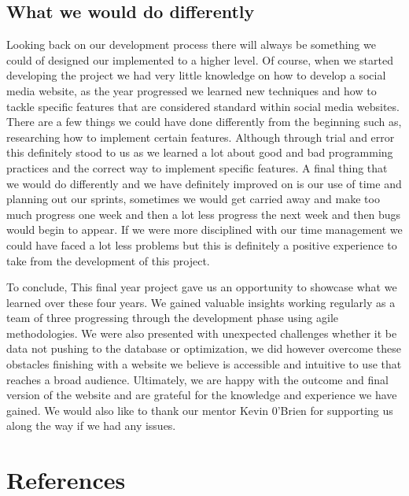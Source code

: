\section{What we would do differently}
\newline
Looking back on our development process there will always be something we could of designed our implemented to a higher level. Of course, when we started developing the project we had very little knowledge on how to develop a social media website, as the year progressed we learned new techniques and how to tackle specific features that are considered standard within social media websites. There are a few things we could have done differently from the beginning such as, researching how to implement certain features. Although through trial and error this definitely stood to us as we learned a lot about good and bad programming practices and the correct way to implement specific features. A final thing that we would do differently and we have definitely improved on is our use of time and planning out our sprints, sometimes we would get carried away and make too much progress one week and then a lot less progress the next week and then bugs would begin to appear. If we were more disciplined with our time management we could have faced a lot less problems but this is definitely a positive experience to take from the development of this project.
\newline

To conclude, This final year project gave us an opportunity to showcase what we learned over these four years. We gained valuable insights working regularly as a team of three progressing through the development phase using agile methodologies.
We were also presented with unexpected challenges whether it be data not pushing to the database or optimization, we did however overcome these obstacles finishing with a website we believe is accessible and intuitive to use that reaches a broad audience.
\newline
Ultimately, we are happy with the outcome and final version of the website and are grateful for the knowledge and experience we have gained. We would also like to thank our mentor Kevin 0'Brien for supporting us along the way if we had any issues.

\chapter{References}
\cite{githublink}
